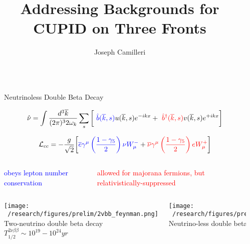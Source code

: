 \documentclass[final]{beamer}
\title{Addressing Backgrounds for CUPID on Three Fronts}
\author{Joseph Camilleri} %
\institute[shortinst]{Virginia Tech} %
\newlength{\sepwidth}
\newlength{\colwidth}
\newcommand{\separatorcolumn}{\begin{column}{\sepwidth}\end{column}}
\begin{document}
\begin{frame}[t]
\begin{columns}[t]
\separatorcolumn

\begin{column}{\colwidth}

  \begin{block}{Neutrinoless Double Beta Decay}
    
      \begin{eqnarray*}
      \hat{\nu} = \int \frac{d^3 \overline{k}}{(2\pi)^3 2 \omega_k} \sum_s
      \bigg[\ \textcolor{blue}{\hat{b}(\overline{k},s)}u(\overline{k},s)e^{-ikx}
       + \ \textcolor{red}{\hat{b}^{\dagger}(\overline{k},s)}v(\overline{k},s)e^{+ikx} \bigg]
      \end{eqnarray*}
      
      \begin{eqnarray*}
      \mathcal{L}_{cc} = -\frac{g}{\sqrt{2}}\bigg[\textcolor{blue}{\overline{e}\gamma^{\mu}\left(\frac{1-\gamma_5}{2}\right)\nu W^{-}_{\mu}} 
      + \textcolor{red}{\overline{\nu}\gamma^{\mu}\left(\frac{1-\gamma_5}{2}\right)e W^{+}_{\mu}}\bigg]
      \end{eqnarray*}
      
      \begin{columns}[c] %
        
        \column{.4\colwidth} %
        \textcolor{blue} {obeys lepton number conservation} 
        
        \column{.4\colwidth} %
        \textcolor{red} {allowed for majorana fermions, but relativistically-suppressed}
        
      \end{columns}
      
      \vspace{1cm}
    \begin{columns}[c] %
        
        \column{.35\colwidth} %
        \texttt{[image: ~/research/figures/prelim/2vbb\_feynman.png]}
        {\footnotesize Two-neutrino double beta decay $T_{1/2}^{2\nu\beta\beta} \sim 10^{19}-10^{24} yr$}
        
        \column{.35\colwidth} %
        \texttt{[image: ~/research/figures/prelim/0vbb\_feynman.png]}
        {\footnotesize Neutrino-less double beta decay $T_{1/2}^{0\nu\beta\beta} > 10^{26} yr$}
        

\end{columns}
\end{block}
\end{column}
\end{columns}
\end{frame}
\end{document}
